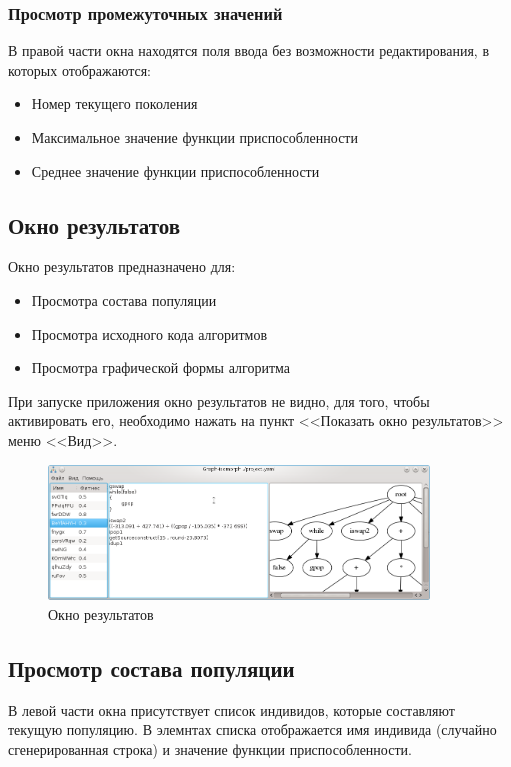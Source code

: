 \documentclass[russian,utf8,emptystyle]{eskdtext}
\begin{document}
\subsubsection{Просмотр промежуточных значений}
В правой части окна находятся поля ввода без возможности редактирования, в которых отображаются:
\begin{itemize}
\item Номер текущего поколения
\item Максимальное значение функции приспособленности
\item Среднее значение функции приспособленности
\end{itemize}


\subsection{Окно результатов}
Окно результатов предназначено для:
\begin{itemize}
\item Просмотра состава популяции
\item Просмотра исходного кода алгоритмов
\item Просмотра графической формы алгоритма
\end{itemize}

При запуске приложения окно результатов не видно, для того, чтобы активировать его, необходимо нажать на пункт <<Показать окно результатов>> меню <<Вид>>.

\begin{figure}[h!]
\centering
\includegraphics[width=0.9\textwidth]{screen10}
\caption{Окно результатов}
\end{figure}

\subsection{Просмотр состава популяции}
В левой части окна присутствует список индивидов, которые составляют текущую популяцию. В элемнтах списка отображается имя индивида (случайно сгенерированная строка) и значение функции приспособленности. 
\end{document}
